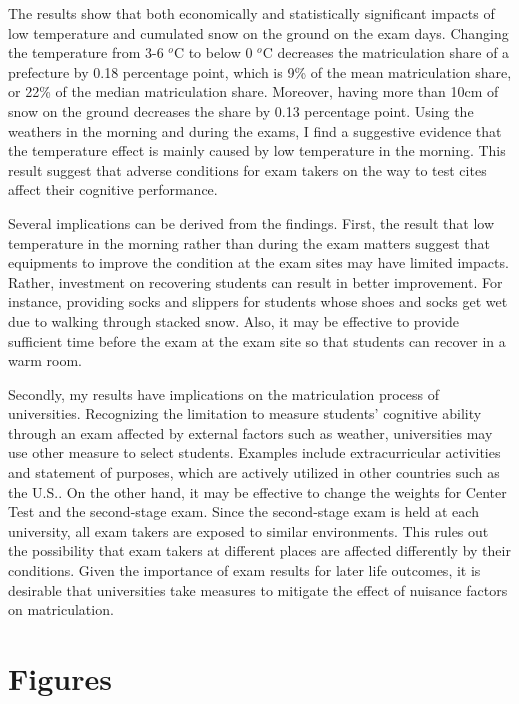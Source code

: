 \documentclass[12pt,letterpaper]{article}
\begin{document}
The results show that both economically and statistically significant impacts of low temperature and cumulated snow on the ground on the exam days.
Changing the temperature from 3-6 $^o$C to below 0 $^o$C decreases the matriculation share of a prefecture by 0.18 percentage point, which is 9\% of the mean matriculation share, or 22\% of the median matriculation share.
Moreover, having more than 10cm of snow on the ground decreases the share by 0.13 percentage point.
Using the weathers in the morning and during the exams, I find a suggestive evidence that the temperature effect is mainly caused by low temperature in the morning.
This result suggest that adverse conditions for exam takers on the way to test cites affect their cognitive performance.

Several implications can be derived from the findings.
First, the result that low temperature in the morning rather than during the exam matters suggest that equipments to improve the condition at the exam sites may have limited impacts.
Rather, investment on recovering students can result in better improvement.
For instance, providing socks and slippers for students whose shoes and socks get wet due to walking through stacked snow.
Also, it may be effective to provide sufficient time before the exam at the exam site so that students can recover in a warm room.

Secondly, my results have implications on the matriculation process of universities.
Recognizing the limitation to measure students' cognitive ability through an exam affected by external factors such as weather, universities may use other measure to select students.
Examples include extracurricular activities and statement of purposes, which are actively utilized in other countries such as the U.S..
On the other hand, it may be effective to change the weights for Center Test and the second-stage exam.
Since the second-stage exam is held at each university, all exam takers are exposed to similar environments.
This rules out the possibility that exam takers at different places are affected differently by their conditions.
Given the importance of exam results for later life outcomes, it is desirable that universities take measures to mitigate the effect of nuisance factors on matriculation.

\clearpage



\section{Figures}
\end{document}

